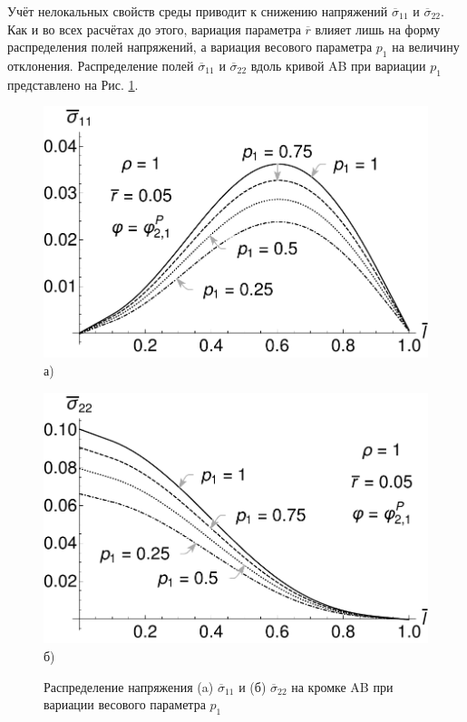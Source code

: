 Учёт нелокальных свойств среды приводит к снижению напряжений $\overline{\sigma}_{11}$ и $\overline{\sigma}_{22}$. Как и во всех расчётах до этого, вариация параметра $\overline{r}$ влияет лишь на форму распределения полей напряжений, а вариация весового параметра $p_1$ на величину отклонения. Распределение полей $\overline{\sigma}_{11}$ и $\overline{\sigma}_{22}$ вдоль кривой AB при вариации $p_1$ представлено на Рис. \ref{fig:ThermalKirshP1Variation}.

\begin{figure}[ht]
    \begin{minipage}[b][][b]{0.49\linewidth}\centering
        \includegraphics[width=\linewidth]{pics/ThermalKirshSigma11VariationP1.pdf} \\ а)
    \end{minipage}
    \hfill
    \begin{minipage}[b][][b]{0.49\linewidth}\centering
        \includegraphics[width=\linewidth]{pics/ThermalKirshSigma22VariationP1.pdf} \\ б)
    \end{minipage}
    \caption{Распределение напряжения (a) $\overline{\sigma}_{11}$ и (б) $\overline{\sigma}_{22}$ на кромке AB при вариации весового параметра $p_1$}
    \label{fig:ThermalKirshP1Variation}
\end{figure}